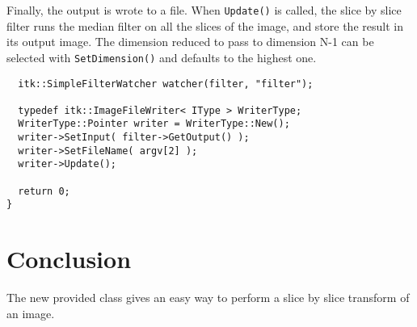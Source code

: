\documentclass{InsightArticle}
\begin{document}
Finally, the output is wrote to a file. When \verb$Update()$ is called, the
slice by slice filter runs the median filter on all the slices of the image,
and store the result in its output image. The dimension reduced to pass to
dimension N-1 can be selected with \verb$SetDimension()$ and defaults to
the highest one.
\small \begin{verbatim}
  itk::SimpleFilterWatcher watcher(filter, "filter");

  typedef itk::ImageFileWriter< IType > WriterType;
  WriterType::Pointer writer = WriterType::New();
  writer->SetInput( filter->GetOutput() );
  writer->SetFileName( argv[2] );
  writer->Update();

  return 0;
}
\end{verbatim} \normalsize

\section{Conclusion}
The new provided class gives an easy way to perform a slice by slice transform of an image.









\appendix





\nocite{ITKSoftwareGuide}
\end{document}
